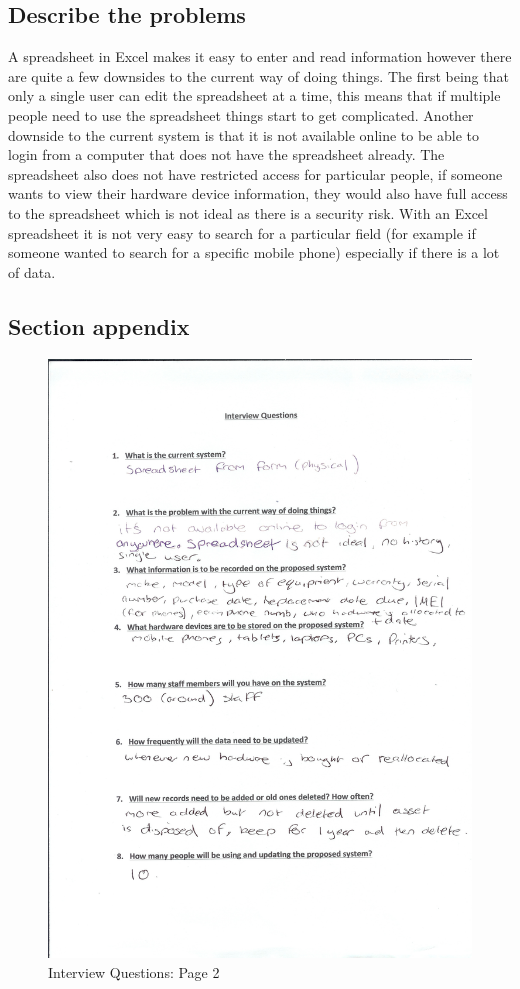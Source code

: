 \subsection{Describe the problems}

A spreadsheet in Excel makes it easy to enter and read information however there are quite a few downsides to the current way of doing things. The first being that only a single user can edit the spreadsheet at a time, this means that if multiple people need to use the spreadsheet things start to get complicated. Another downside to the current system is that it is not available online to be able to login from a computer that does not have the spreadsheet already. The spreadsheet also does not have restricted access for particular people, if someone wants to view their hardware device information, they would also have full access to the spreadsheet which is not ideal as there is a security risk. With an Excel spreadsheet it is not very easy to search for a particular field (for example if someone wanted to search for a specific mobile phone) especially if there is a lot of data.

\subsection{Section appendix}

\begin{figure}[H]
\includegraphics[width=.9\textwidth,height=.9\textheight,keepaspectratio]{Page1Interview.jpg}
\caption{Interview Questions: Page 2} \label{Page1Interview}
\end{figure}

